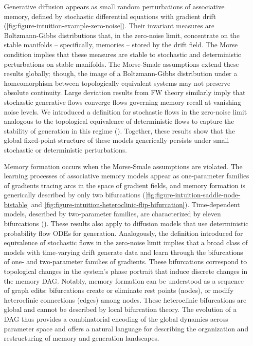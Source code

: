 \documentclass[12pt]{article}
\newcommand\colorAutoref[1]{{\hypersetup{linkcolor=blue}\autoref{#1}}}  %
\begin{document}
Generative diffusion appears as small random perturbations of associative memory, defined by stochastic differential equations with gradient drift (\colorAutoref{fig:figure-intuition-example-zero-noise}). Their invariant measures are Boltzmann-Gibbs distributions that, in the zero-noise limit, concentrate on the stable manifolds -- specifically, memories -- stored by the drift field. The Morse condition implies that these measures are stable to stochastic and deterministic perturbations on stable manifolds. The Morse-Smale assumptions extend these results globally; though, the image of a Boltzmann-Gibbs distribution under a homeomorphism between topologically equivalent systems may not preserve absolute continuity. Large deviation results from FW theory similarly imply that stochastic generative flows converge flows governing memory recall at vanishing noise levels. We introduced a definition for stochastic flows in the zero-noise limit analogous to the topological equivalence of deterministic flows to capture the stability of generation in this regime (). Together, these results show that the global fixed-point structure of these models generically persists under small stochastic or deterministic perturbations.

Memory formation occurs when the Morse-Smale assumptions are violated. The learning processes of associative memory models appear as one-parameter families of gradients tracing arcs in the space of gradient fields, and memory formation is generically described by only two bifurcations (\colorAutoref{fig:figure-intuition-saddle-node-bistable} and \colorAutoref{fig:figure-intuition-heteroclinic-flip-bifurcation}). Time-dependent models, described by two-parameter families, are characterized by eleven bifurcations (). These results also apply to diffusion models that use deterministic probability flow ODEs for generation. Analogously, the definition introduced for equivalence of stochastic flows in the zero-noise limit implies that a broad class of models with time-varying drift generate data and learn through the bifurcations of one- and two-parameter families of gradients. These bifurcations correspond to topological changes in the system’s phase portrait that induce discrete changes in the memory DAG. Notably, memory formation can be understood as a sequence of graph edits: bifurcations create or eliminate rest points (nodes), or modify heteroclinic connections (edges) among nodes. These heteroclinic bifurcations are global and cannot be described by local bifurcation theory. The evolution of a DAG thus provides a combinatorial encoding of the global dynamics across parameter space and offers a natural language for describing the organization and restructuring of memory and generation landscapes.
\end{document}
